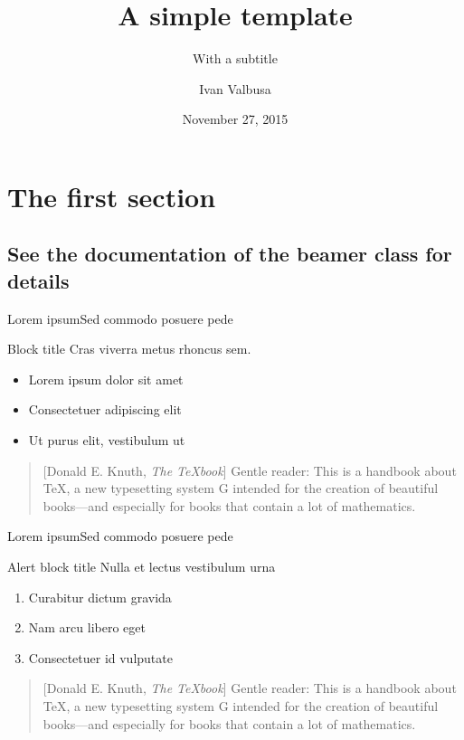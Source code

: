 \documentclass[10pt]{beamer}
\title{A simple template}
\subtitle{With a subtitle}
\author[Ivan Valbusa]{Ivan Valbusa}
\institute[University of Verona]{Department of Philology, Literature, and Linguistics\\
University of Verona}
\date{November 27, 2015}
\begin{document}
\maketitle

\section{The first section}

\subsection{See the documentation of the beamer class for details}

\begin{frame}[<+->]{Lorem ipsum}{Sed commodo posuere pede}

    \begin{block}{Block title}
    Cras viverra metus rhoncus sem.
    \end{block}
    
    \begin{itemize}
    	\item Lorem ipsum dolor sit amet
    	\item Consectetuer adipiscing elit
    	\item Ut purus elit, vestibulum ut
    \end{itemize}

\begin{quotation}[Donald E. Knuth, \emph{The \TeX book}]
Gentle reader: This is a handbook about \TeX, a new typesetting system G intended for the creation of beautiful books—and especially for books that contain a lot of mathematics.
\end{quotation}

\end{frame}
\begin{frame}{Lorem ipsum}{Sed commodo posuere pede}

    \begin{alertblock}{Alert block title}
    Nulla et lectus vestibulum urna   
    \end{alertblock}
    
    
    \begin{enumerate}[<+->]
    	\item Curabitur dictum gravida
    	\item Nam arcu libero eget
    	\item Consectetuer id vulputate
    \end{enumerate}

\begin{quotation}[Donald E. Knuth, \emph{The \TeX book}]
Gentle reader: This is a handbook about \TeX, a new typesetting system G intended for the creation of beautiful books—and especially for books that contain a lot of mathematics.
\end{quotation}

\end{frame}
\end{document}
